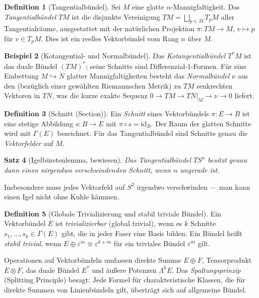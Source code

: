 \documentclass[12pt,a4paper]{amsart}
\newtheorem{theorem}{Satz}[section]
\theoremstyle{definition}
\newtheorem{definition}[theorem]{Definition}
\newtheorem{example}[theorem]{Beispiel}
\begin{document}
\begin{definition}[Tangentialbündel]
Sei $M$ eine glatte $n$-Mannigfaltigkeit. Das \emph{Tangentialbündel} $TM$ ist
die disjunkte Vereinigung $TM = \bigsqcup_{p \in M} T_pM$ aller Tangentialräume,
ausgestattet mit der natürlichen Projektion $\pi \colon TM \to M$,
$v \mapsto p$ für $v \in T_pM$. Dies ist ein reelles Vektorbündel vom Rang $n$
über $M$.
\end{definition}

\begin{example}[Kotangential- und Normalbündel]
Das \emph{Kotangentialbündel} $T^*M$ ist das duale Bündel $(TM)^*$; seine
Schnitte sind Differenzial-$1$-Formen. Für eine Einbettung $M \hookrightarrow N$
glatter Mannigfaltigkeiten besteht das \emph{Normalbündel} $\nu$ aus den
(bezüglich einer gewählten Riemannschen Metrik) zu $TM$ senkrechten Vektoren
in $TN$, was die kurze exakte Sequenz
$0 \to TM \to TN|_M \to \nu \to 0$
liefert.
\end{example}

\begin{definition}[Schnitt (Section)]
Ein \emph{Schnitt} eines Vektorbündels $\pi \colon E \to B$ ist eine stetige
Abbildung $s \colon B \to E$ mit $\pi \circ s = \mathrm{id}_B$. Der Raum der
glatten Schnitte wird mit $\Gamma(E)$ bezeichnet. Für das Tangentialbündel sind
Schnitte genau die \emph{Vektorfelder} auf $M$.
\end{definition}

\begin{theorem}[Igelbürstenlemma, bewiesen]
\label{thm:igel}
Das Tangentialbündel $TS^n$ besitzt genau dann einen nirgendwo verschwindenden
Schnitt, wenn $n$ ungerade ist.
\end{theorem}

Insbesondere muss jedes Vektorfeld auf $S^2$ irgendwo verschwinden --- man
kann einen Igel nicht ohne Kuhle kämmen.

\begin{definition}[Globale Trivializierung und stabil triviale Bündel]
Ein Vektorbündel $E$ ist \emph{trivializierbar} (global trivial), wenn es
$k$ Schnitte $s_1, \ldots, s_k \in \Gamma(E)$ gibt, die in jeder Faser eine
Basis bilden. Ein Bündel heißt \emph{stabil trivial}, wenn
$E \oplus \varepsilon^m \cong \varepsilon^{k+m}$ für ein triviales Bündel
$\varepsilon^m$ gilt.
\end{definition}

Operationen auf Vektorbündeln umfassen direkte Summe $E \oplus F$, Tensorprodukt
$E \otimes F$, das duale Bündel $E^*$ und äußere Potenzen $\Lambda^k E$. Das
\emph{Spaltungsprinzip} (Splitting Principle) besagt: Jede Formel für
charakteristische Klassen, die für direkte Summen von Linienbündeln gilt,
überträgt sich auf allgemeine Bündel.
\end{document}
